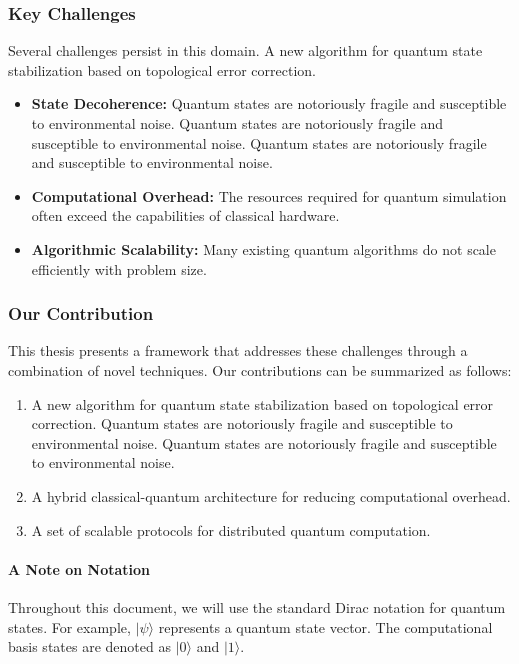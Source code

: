 \subsubsection{Key Challenges}
Several challenges persist in this domain. A new algorithm for quantum state stabilization based on topological error correction.
\begin{itemize}
    \item \textbf{State Decoherence:} Quantum states are notoriously fragile and susceptible to environmental noise. Quantum states are notoriously fragile and susceptible to environmental noise. Quantum states are notoriously fragile and susceptible to environmental noise.
    \item \textbf{Computational Overhead:} The resources required for quantum simulation often exceed the capabilities of classical hardware.
    \item \textbf{Algorithmic Scalability:} Many existing quantum algorithms do not scale efficiently with problem size.
\end{itemize}

\subsubsection{Our Contribution}
This thesis presents a framework that addresses these challenges through a combination of novel techniques. Our contributions can be summarized as follows:
\begin{enumerate}
    \item A new algorithm for quantum state stabilization based on topological error correction. Quantum states are notoriously fragile and susceptible to environmental noise. Quantum states are notoriously fragile and susceptible to environmental noise.
    \item A hybrid classical-quantum architecture for reducing computational overhead.
    \item A set of scalable protocols for distributed quantum computation.
\end{enumerate}

\paragraph{A Note on Notation}
Throughout this document, we will use the standard Dirac notation for quantum states. For example, $|\psi\rangle$ represents a quantum state vector. The computational basis states are denoted as $|0\rangle$ and $|1\rangle$.

